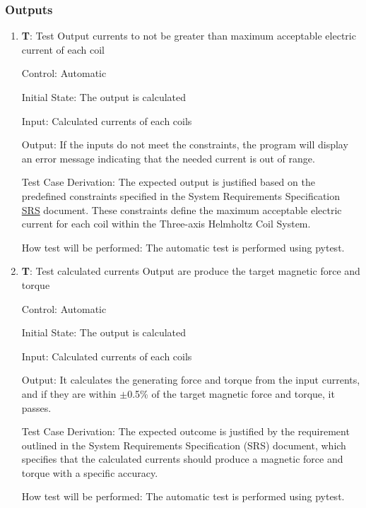 \documentclass[12pt, titlepage]{article}
\newcounter{testCase}
\newcommand{\testCaseFormat}{T\thetestCase}
\begin{document}
\subsubsection{Outputs}\label{subsec:Outputs}
\begin{enumerate}

\item{\textbf{\testCaseFormat \label{T_output1}}: Test Output currents to not be greater than maximum acceptable electric current of each coil\label{subsec:Outputs1}}

Control: Automatic
					
Initial State: The output is calculated
					
Input: Calculated currents of each coils 
			
Output: If the inputs do not meet the constraints, the program will display an error message indicating that the needed current is out of range.

Test Case Derivation: The expected output is justified based on the predefined constraints specified in the System Requirements Specification  \href{https://github.com/rnorouziani/Helmholtz-Coil-Current-Calculator-CAS741/blob/main/docs/SRS/SRS.pdf}{SRS} document. These constraints define the maximum acceptable electric current for each coil within the Three-axis Helmholtz Coil System.				

How test will be performed: The automatic test is performed using pytest.

\item{\textbf{\testCaseFormat \label{T_output2}}: Test calculated currents Output are produce the target magnetic force and torque}

Control: Automatic
					
Initial State: The output is calculated
					
Input: Calculated currents of each coils 
			
Output: It calculates the generating force and torque from the input currents, and if they are within $\pm$0.5\% of the target magnetic force and torque, it passes.

Test Case Derivation: The expected outcome is justified by the requirement outlined in the System Requirements Specification (SRS) document, which specifies that the calculated currents should produce a magnetic force and torque with a specific accuracy. 				

How test will be performed: The automatic test is performed using pytest.
			
\end{enumerate}
\end{document}

